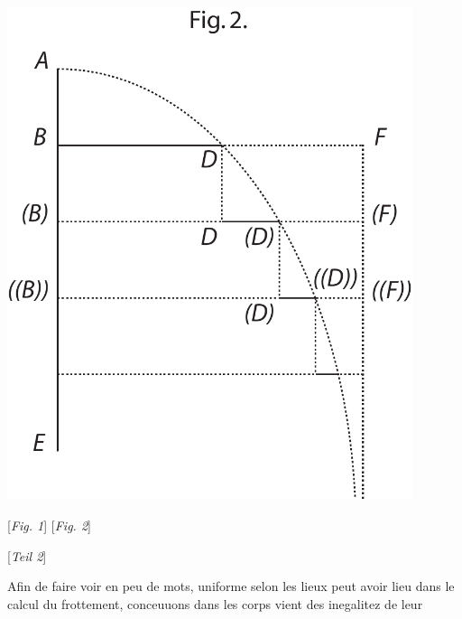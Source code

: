\begin{minipage}[t]{0.5\textwidth}
\includegraphics[trim = 0mm 0mm 0mm 10mm, clip, width=0.89\textwidth]{images/lh0350911_002r-d2.pdf}
\end{minipage}
\hspace*{26mm} [\textit{Fig. 1}]\hspace*{57mm} [\textit{Fig. 2}]
\pend
\newpage
\pstart \begin{center} [\textit{Teil 2}] \end{center} \pend 
\count{}
\pstart
\noindent
Afin
 de faire voir en peu de mots,
uniforme selon les lieux peut avoir lieu dans le calcul du frottement,
conceuuons 
dans les corps vient des inegalitez de leur
